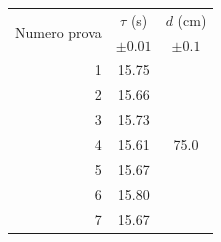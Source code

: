 \documentclass{article}
\begin{document}
\begin{table}[h!]
	\begin{minipage}{0.1\textwidth}
		\centering
		\begin{tabular}{ | r | c | c | }
    		\hline
    		\multirow{2}{5em}{Numero prova} & $\tau$ (s) & $d$ (cm) \\
    		& $\pm 0.01$ & $\pm 0.1$ \\
    		\hline
    		1 & 15.75 & \multirow{7}{*}{75.0} \\ \cline{1-2}
    		2 & 15.66 & \\ \cline{1-2}
    		3 & 15.73 & \\ \cline{1-2}
    		4 & 15.61 & \\ \cline{1-2}
    		5 & 15.67 & \\ \cline{1-2}
    		6 & 15.80 & \\ \cline{1-2}
    		7 & 15.67 & \\ \cline{1-2}
    		\hline
		\end{tabular}
	\end{minipage}
\end{table}
\end{document}
